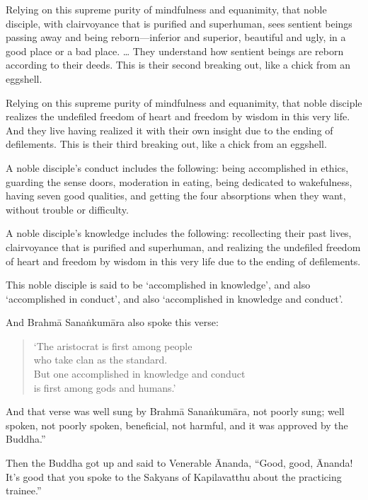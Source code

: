 \documentclass[12pt,openany]{book}%
\begin{document}
Relying on this supreme purity of mindfulness and equanimity, that noble disciple, with clairvoyance that is purified and superhuman, sees sentient beings passing away and being reborn—inferior and superior, beautiful and ugly, in a good place or a bad place. … They understand how sentient beings are reborn according to their deeds. This is their second breaking out, like a chick from an eggshell. 

Relying on this supreme purity of mindfulness and equanimity, that noble disciple realizes the undefiled freedom of heart and freedom by wisdom in this very life. And they live having realized it with their own insight due to the ending of defilements. This is their third breaking out, like a chick from an eggshell. 

A noble disciple’s conduct includes the following: being accomplished in ethics, guarding the sense doors, moderation in eating, being dedicated to wakefulness, having seven good qualities, and getting the four absorptions when they want, without trouble or difficulty. 

A noble disciple’s knowledge includes the following: recollecting their past lives, clairvoyance that is purified and superhuman, and realizing the undefiled freedom of heart and freedom by wisdom in this very life due to the ending of defilements. 

This noble disciple is said to be ‘accomplished in knowledge’, and also ‘accomplished in conduct’, and also ‘accomplished in knowledge and conduct’. 

And \textsanskrit{Brahmā} \textsanskrit{Sanaṅkumāra} also spoke this verse: 

\begin{verse}%
‘The aristocrat is first among people \\
who take clan as the standard. \\
But one accomplished in knowledge and conduct \\
is first among gods and humans.’ 

%
\end{verse}

And that verse was well sung by \textsanskrit{Brahmā} \textsanskrit{Sanaṅkumāra}, not poorly sung; well spoken, not poorly spoken, beneficial, not harmful, and it was approved by the Buddha.” 

Then the Buddha got up and said to Venerable Ānanda, “Good, good, Ānanda! It’s good that you spoke to the Sakyans of Kapilavatthu about the practicing trainee.” 
\end{document}
